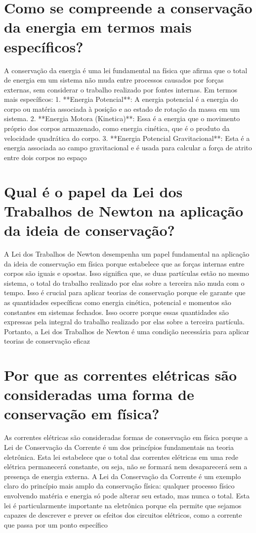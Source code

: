 \documentclass[11pt,a4paper]{article}
\begin{document}
\section{Como se compreende a conservação da energia em termos mais específicos?}
A conservação da energia é uma lei fundamental na física que afirma que o total de energia em um sistema não muda entre processos causados por forças externas, sem considerar o trabalho realizado por fontes internas. Em termos mais específicos: 1. **Energia Potencial**: A energia potencial é a energia do corpo ou matéria associada à posição e ao estado de rotação da massa em um sistema. 2. **Energia Motora (Kinetica)**: Essa é a energia que o movimento próprio dos corpos armazenado, como energia cinética, que é o produto da velocidade quadrática do corpo. 3. **Energia Potencial Gravitacional**: Esta é a energia associada ao campo gravitacional e é usada para calcular a força de atrito entre dois corpos no espaço

\section{Qual é o papel da Lei dos Trabalhos de Newton na aplicação da ideia de conservação?}
A Lei dos Trabalhos de Newton desempenha um papel fundamental na aplicação da ideia de conservação em física porque estabelece que as forças internas entre corpos são iguais e opostas. Isso significa que, se duas partículas estão no mesmo sistema, o total do trabalho realizado por elas sobre a terceira não muda com o tempo. Isso é crucial para aplicar teorias de conservação porque ele garante que as quantidades específicas como energia cinética, potencial e momentos são constantes em sistemas fechados. Isso ocorre porque essas quantidades são expressas pela integral do trabalho realizado por elas sobre a terceira partícula. Portanto, a Lei dos Trabalhos de Newton é uma condição necessária para aplicar teorias de conservação eficaz

\section{Por que as correntes elétricas são consideradas uma forma de conservação em física?}
As correntes elétricas são consideradas formas de conservação em física porque a Lei de Conservação da Corrente é um dos princípios fundamentais na teoria eletrônica. Esta lei estabelece que o total das correntes elétricas em uma rede elétrica permanecerá constante, ou seja, não se formará nem desaparecerá sem a presença de energia externa. A Lei da Conservação da Corrente é um exemplo claro do princípio mais amplo da conservação física: qualquer processo físico envolvendo matéria e energia só pode alterar seu estado, mas nunca o total. Esta lei é particularmente importante na eletrônica porque ela permite que sejamos capazes de descrever e prever os efeitos dos circuitos elétricos, como a corrente que passa por um ponto específico
\end{document}
